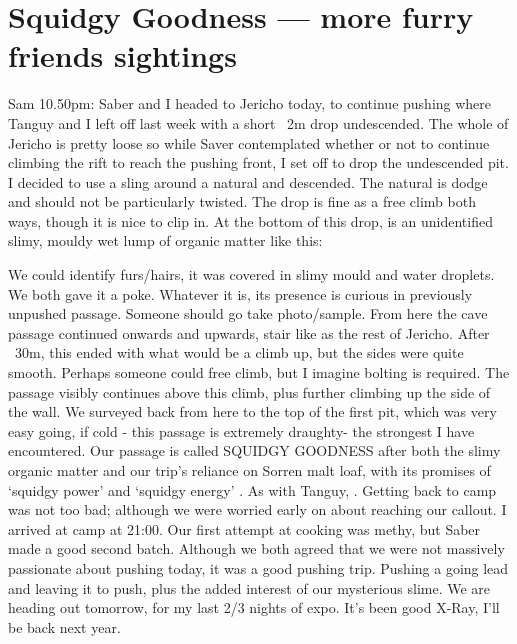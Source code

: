 \section{Squidgy Goodness --- more furry friends sightings}
\begin{marginfigure}
\end{marginfigure}


Sam 10.50pm: Saber and I headed to Jericho today, to continue pushing where Tanguy and I left off last week with a short ~2m drop undescended. The whole of Jericho is pretty loose so while Saver contemplated whether or not to continue climbing the rift to reach the pushing front, I set off to drop the undescended pit.
I decided to use a sling around a natural and descended. The natural is dodge and should not be particularly twisted. The drop is fine as a free climb both ways, though it is nice to clip in. At the bottom of this drop, is an unidentified slimy, mouldy wet lump of organic matter like this: 

We could identify furs/hairs, it was covered in slimy mould and water droplets. We both gave it a poke. Whatever it is, its presence is curious in previously unpushed passage. Someone should go take photo/sample.
From here the cave passage continued onwards and upwards, stair like as the rest of Jericho. After ~30m, this ended with what would be a climb up, but the sides were quite smooth. Perhaps someone could free climb, but I imagine bolting is required. The passage visibly continues above this climb, plus further climbing up the side of the wall. We surveyed back from here to  the top of the first pit, which was very easy going, if cold  - this passage is extremely draughty- the strongest I have encountered. Our passage is called SQUIDGY GOODNESS after both the slimy organic matter and our trip’s reliance on Sorren malt loaf, with its promises of ‘squidgy power’ and ‘squidgy energy’ . As with Tanguy, .
Getting back to camp was not too bad; although we were worried early on about reaching our callout. I arrived at camp at 21:00. Our first attempt at cooking was methy, but Saber made a good second batch. Although we both agreed that we were not massively passionate about pushing today, it was a good pushing trip. Pushing a going lead and leaving it to push, plus the added interest of our mysterious slime.
We are heading out tomorrow, for my last 2/3 nights of expo. It’s been good X-Ray, I’ll be back next year.

